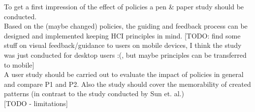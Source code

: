 \documentclass[twocolumn, a4paper, 10pt]{article}
\begin{document}
To get a first impression of the effect of policies a pen \& paper study should be conducted.\\

Based on the (maybe changed) policies, the guiding and feedback process can be designed and implemented keeping HCI principles in mind. [TODO: find some stuff on visual feedback/guidance to users on mobile devices, I think the study was just conducted for desktop users :(, but maybe principles can be transferred to mobile]\\

A user study should be carried out to evaluate the impact of policies in general and compare P1 and P2. Also the study should cover the memorability of created patterns (in contrast to the study conducted by Sun et. al.)\\

[TODO - limitations]

{
	
	
}

\appendix
\end{document}
